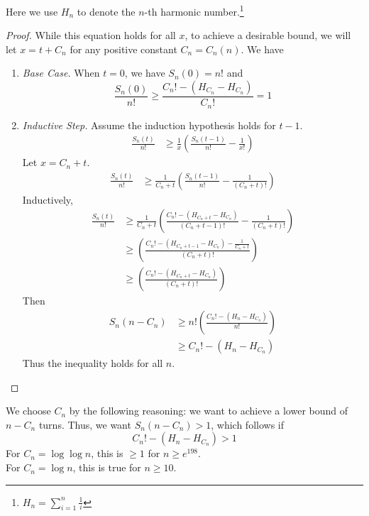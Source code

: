 \documentclass[12pt, a4paper]{article}
\begin{document}
	Here we use $H_n$ to denote the $n$-th harmonic number.\footnote{$H_n=\sum_{i = 1}
	^n\frac{1}{i}$}
		\begin{proof}
		While this equation holds for all $x$, to achieve a desirable bound, we will
		let $x=t+C_{n}$ for any positive constant $C_{n}=C_{n}(n)$. We have
		\begin{enumerate}[label=]
		\item\textit{Base Case.} When $t=0$, we have $S_n(0)= n!$ and
			\begin{equation*}
			\frac{S_{n}(0)}{n!}\ge \frac{C_{n}! - (H_{C_{n}}-H_{C_{n}})}{C_{n}!} = 1
			\end{equation*}
			
		\item \textit{Inductive Step.} Assume the induction hypothesis holds for $t-1$.
			\begin{align*}
			\frac{S_{n}(t)}{n!}
			& \ge \frac{1}{x}\left(\frac{S_{n}(t-1)}{n!}-\frac{1}{x!}\right)
			\end{align*}
		Let $x=C_{n}+t$.
			\begin{align*}
			\frac{S_{n}(t)}{n!}
			& \ge \frac{1}{C_{n}+t}\left(\frac{S_{n}(t-1)}{n!}
			-\frac{1}{(C_{n}+t)!}\right)
			\end{align*}
		Inductively,
			\begin{align*}
			\frac{S_{n}(t)}{n!}
			& \ge \frac{1}{C_{n}+t}\left(\frac{C_{n}!-(H_{C_{n}+t} - H_{C_{n}})}
			{(C_{n}+t-1)!} - \frac{1}{(C_{n}+t)!}\right)\\
			& \ge \left(\frac{C_{n}! - (H_{C_{n}+t-1} - H_{C_{n}}) - \frac{1}{C_{n}+t}}
			{(C_{n}+t)!}\right)\\
			& \ge \left(\frac{C_{n}! - (H_{C_{n}+t} - H_{C_{n}})}{(C_{n}+t)!}\right)
			\end{align*}
			Then
			\begin{align*}
			S_{n}(n-C_{n}) & \ge n!\left(\frac{C_{n}! - (H_n - H_{C_{n}})}{n!}\right)\\
			& \ge C_{n}! - (H_n-H_{C_{n}})
			\end{align*}
		Thus the inequality holds for all $n$.
		\end{enumerate}
		\end{proof}
		We choose $C_{n}$ by the following reasoning: we want to achieve a lower bound
		of $n-C_{n}$ turns. Thus, we want $S_n(n-C_{n})>1$, which follows if
		\begin{equation*}
		C_{n}! - (H_n - H_{C_{n}}) > 1
		\end{equation*}
		For $C_{n}=\log\log n$, this is $\ge 1$ for $n\ge e^{198}$.\\
		For $C_{n}=\log n$, this is true for $n\ge 10$.
		
\end{document}
